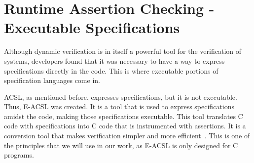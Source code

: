 \section{Runtime Assertion Checking - Executable Specifications}

Although dynamic verification is in itself a powerful tool for the verification of systems, 
developers found that it was necessary to have a way to express specifications directly in the 
code. This is where executable portions of specification languages come in. 

ACSL, as mentioned before, expresses specifications, but it is not executable. Thus, 
E-ACSL was created. It is a tool that is used to express specifications 
amidst the code, making those specifications executable. This tool translates C code with 
specifications into C code that is instrumented with assertions. It is a conversion tool 
that makes verification simpler and more efficient~\cite{Maurica2018}. This is one of the 
principles that we will use in our work, as E-ACSL is only designed for C programs.